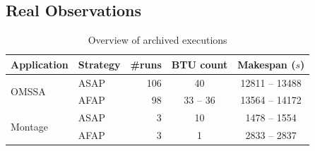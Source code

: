 \documentclass[10pt,conference,compsocconf]{IEEEtran}
\begin{document}

\subsection{Real Observations}

\begin{table} \centering \caption{Overview of archived
	executions}\label{tab:nbruns} 
	\begin{tabular}{llrcc} \toprule
		Application&Strategy&\#runs&BTU count&Makespan ($s$)\\
		\midrule 
		\multirow{2}{*}{OMSSA}&ASAP&106&40&12811 -- 13488\\
				      &AFAP&98&33 -- 36&13564 -- 14172\\ 
		\midrule 
		\multirow{2}{*}{Montage}&ASAP&3&10&1478 -- 1554\\
				        &AFAP&3&1&2833 -- 2837\\
		\bottomrule 
	\end{tabular} 
\end{table}
\end{document}
